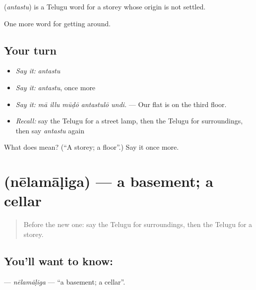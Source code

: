\begin{cousinweb}
\textbf{} (\emph{antastu}) is a Telugu word for a storey whose origin is not settled.
\end{cousinweb}

\begin{grammarlens}[title={What you've built}]
One more word for getting around.
\end{grammarlens}

\subsection*{Your turn}
\begin{itemize}
\raggedright
  \item \emph{Say it:} \emph{antastu}
  \item \emph{Say it:} \emph{antastu}, once more
  \item \emph{Say it:} \emph{mā illu mūḍō antastulō undi.} — Our flat is on the third floor.
  \item \emph{Recall:} say the Telugu for a street lamp, then the Telugu for surroundings, then say \emph{antastu} again
\end{itemize}

\begin{tcolorbox}[breakable,colback=teal!4,colframe=teal!35!black,title={Before you move on}]
What does  mean? (\textquotedblleft{}A storey; a floor\textquotedblright{}.) Say it once more.
\end{tcolorbox}
\section[\texorpdfstring{\te{నేలమాళిగ} (nēlamāḷiga)}{నేలమాళిగ (nēlamāḷiga)}]{ (nēlamāḷiga) — a basement; a cellar}

\label{lesson:TE-C467-nelamaliga}



\begin{quote}
Before the new one: say the Telugu for surroundings, then the Telugu for a storey.
\end{quote}

\subsection*{You'll want to know: }
\textbf{} — \emph{nēlamāḷiga} — \textquotedblleft{}a basement; a cellar\textquotedblright{}.

